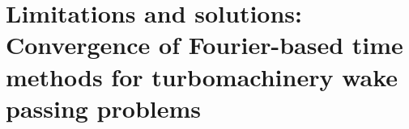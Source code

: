 
\chapter{Limitations and solutions: Convergence of Fourier-based 
time methods for turbomachinery wake passing problems}
\label{cha:limitations_convergence}

\chabstract{}

\minitoc
\newpage

\chconclu{}
